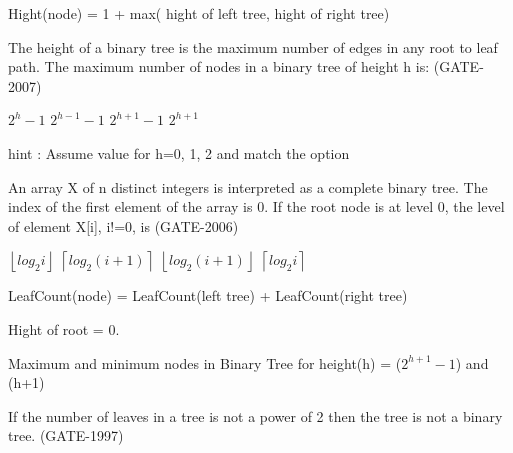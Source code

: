 
  \question Hight(node) = 1 + max( hight of left tree, hight of right tree) \\

\begin{questyle}
  \question  The height of a binary tree is the maximum number of edges in any root to leaf path.
              The maximum number of nodes in a binary tree of height h is:  (GATE-2007)

  \begin{oneparchoices}
    \choice         \( 2^h - 1 \)
    \choice         \( 2^{h-1} - 1 \)
    \CorrectChoice  \( 2^{h+1} - 1 \)
    \choice         \( 2^{h+1}\)
  \end{oneparchoices}
  hint : Assume value for h=0, 1, 2 and match the option
\end{questyle}


\begin{questyle}
  \question  An array X of n distinct integers is interpreted as a complete binary tree. The
            index of the first element of the array is 0. If the root node is at level 0, the level of
            element X[i], i!=0, is  (GATE-2006)

  \begin{oneparchoices}
    \choice         \( \left \lfloor log_2i \right \rfloor \)
    \choice         \( \left \lceil log_2{(i+1)} \right \rceil \)
    \CorrectChoice  \( \left \lfloor log_2{(i+1)} \right \rfloor \)
    \choice         \( \left \lceil log_2{i} \right \rceil \)
  \end{oneparchoices}
\end{questyle}



\question LeafCount(node) = LeafCount(left tree) + LeafCount(right tree)

\question Hight of root = 0.

\question Maximum and minimum nodes in Binary Tree for height(h) = (\(2^{h+1} -1\)) and (h+1)

\begin{questyle}
  \question  If the number of leaves in a tree is not a power of 2 then the tree is not a binary tree.  (GATE-1997)
\end{questyle}

